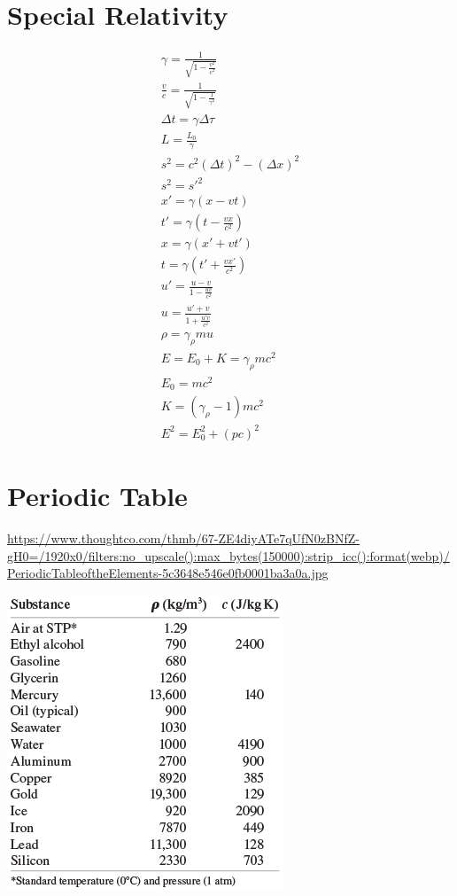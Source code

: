 \documentclass[12pt, letterpaper]{article}
\begin{document}
\section*{Special Relativity}
\begin{align}
  \gamma = \frac{1}{\sqrt{1-\frac{v^2}{c^2}}} \\
  \frac{v}{c} = \frac{1}{\sqrt{1-\frac{1}{\gamma^2}}} \\
  \Delta t = \gamma\Delta\tau \\
  L = \frac{L_0}{\gamma} \\
  s^2 = c^2(\Delta t)^2 - (\Delta x)^2 \\
  s^2 = s\prime^2 \\
  x\prime = \gamma(x - vt) \\
  t\prime = \gamma(t - \frac{vx}{c^2}) \\
  x = \gamma(x\prime + vt\prime) \\
  t = \gamma(t\prime + \frac{vx\prime}{c^2}) \\
  u\prime = \frac{u - v}{1-\frac{uv}{c^2}} \\
  u = \frac{u\prime + v}{1+\frac{u\prime v}{c^2}} \\
  \rho = \gamma_\rho mu \\
  E = E_0 + K = \gamma_\rho mc^2 \\
  E_0 = mc^2 \\
  K = (\gamma_\rho - 1)mc^2 \\
  E^2 = E_0^2 + (pc)^2
\end{align}

\section*{Periodic Table}
\url{https://www.thoughtco.com/thmb/67-ZE4diyATe7qUfN0zBNfZ-gH0=/1920x0/filters:no_upscale():max_bytes(150000):strip_icc():format(webp)/PeriodicTableoftheElements-5c3648e546e0fb0001ba3a0a.jpg}

\includegraphics{densities}
\end{document}
